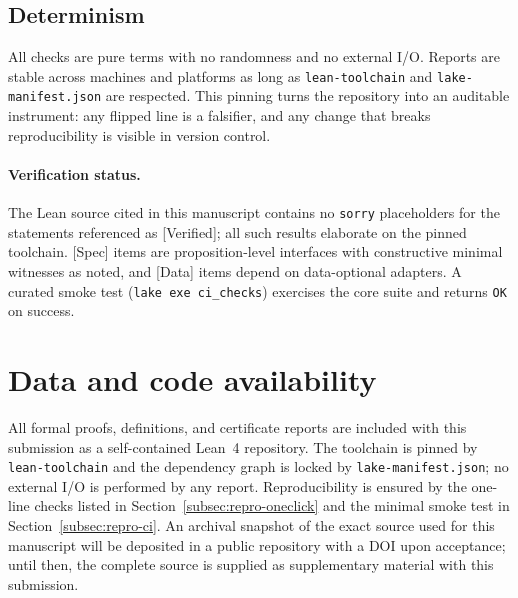 \documentclass[11pt,a4paper,twoside]{article}
\numberwithin{equation}{section}
\theoremstyle{customthm}
\theoremstyle{customdef}
\theoremstyle{customrem}
\begin{document}
\subsection{Determinism}\label{subsec:repro-determinism}

All checks are pure terms with no randomness and no external I/O. Reports are stable across machines and platforms as long as \texttt{lean-toolchain} and \texttt{lake-manifest.json} are respected. This pinning turns the repository into an auditable instrument: any flipped line is a falsifier, and any change that breaks reproducibility is visible in version control.

\paragraph{Verification status.} The Lean source cited in this manuscript contains no \texttt{sorry} placeholders for the statements referenced as [Verified]; all such results elaborate on the pinned toolchain. [Spec] items are proposition-level interfaces with constructive minimal witnesses as noted, and [Data] items depend on data-optional adapters. A curated smoke test (\texttt{lake exe ci\_checks}) exercises the core suite and returns \texttt{OK} on success.

\section*{Data and code availability}\label{sec:data-availability}

All formal proofs, definitions, and certificate reports are included with this submission as a self-contained Lean~4 repository. The toolchain is pinned by \texttt{lean-toolchain} and the dependency graph is locked by \texttt{lake-manifest.json}; no external I/O is performed by any report. Reproducibility is ensured by the one-line checks listed in Section~\ref{subsec:repro-oneclick} and the minimal smoke test in Section~\ref{subsec:repro-ci}. An archival snapshot of the exact source used for this manuscript will be deposited in a public repository with a DOI upon acceptance; until then, the complete source is supplied as supplementary material with this submission.

\end{document}
